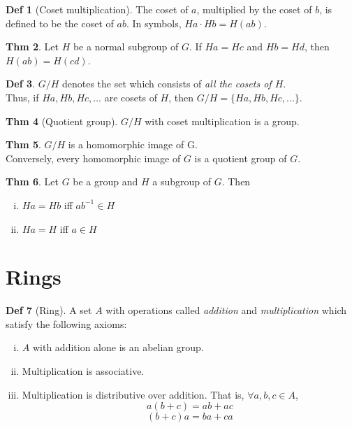 \documentclass{article}
\theoremstyle{definition}
\newtheorem{definition}{Def}[section]
\newtheorem{theorem}[definition]{Thm}
\begin{document}
\begin{definition}[Coset multiplication]
    The coset of $a$, multiplied by the coset of $b$, is defined to be the coset of $ab$. In symbols, $Ha \cdot Hb = H(ab)$.
\end{definition}

\begin{theorem}
    Let $H$ be a normal subgroup of $G$. If $Ha = Hc$ and $Hb = Hd$, then $H(ab) = H(cd)$.
\end{theorem}

\begin{definition}
    $G/H$ denotes the set which consists of \emph{all the cosets of $H$}.
    \\
    Thus, if $Ha, Hb, Hc, \ldots$ are cosets of $H$, then $G/H = \{ Ha, Hb, Hc, ... \}$.
\end{definition}

\begin{theorem}[Quotient group]
    $G/H$ with coset multiplication is a group.
\end{theorem}

\begin{theorem}
    $G/H$ is a homomorphic image of G.
    \\
    Conversely, every homomorphic image of $G$ is a quotient group of $G$.
\end{theorem}

\begin{theorem}
    Let $G$ be a group and $H$ a subgroup of $G$. Then
    \begin{enumerate}[i.]
	\item $Ha = Hb$ iff ${ab}^{-1} \in H$
	\item $Ha = H$ iff $a \in H$
    \end{enumerate}
\end{theorem}


\section{Rings}

\begin{definition}[Ring]
    A set $A$ with operations called \emph{addition} and \emph{multiplication} which satisfy the following axioms:
    \begin{enumerate}[i.]
	\item $A$ with addition alone is an abelian group.
	\item Multiplication is associative.
	\item Multiplication is distributive over addition. That is, $\forall a,b,c \in A$,
	    $$a(b+c) = ab + ac$$
	    $$(b+c)a = ba + ca$$
    \end{enumerate}
\end{definition}
\end{document}
